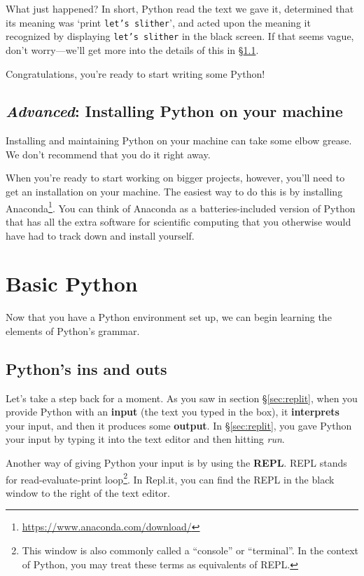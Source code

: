 \documentclass{article}
\let\oldsection\section
\renewcommand\section{\clearpage\oldsection}
\let\oldref\ref
\renewcommand\ref{\S\oldref}
\begin{document}
What just happened? In short, Python read the text we gave it, determined that its meaning was `print {\tt let's slither}', and acted upon the meaning it recognized by displaying {\tt let's slither} in the black screen. If that seems vague, don't worry---we'll get more into the details of this in \ref{sec:repl}.

Congratulations, you're ready to start writing some Python!

\subsection{{\slshape Advanced}: Installing Python on your machine}
\label{install}

Installing and maintaining Python on your machine can take some elbow grease. We don't recommend that you do it right away. 

When you're ready to start working on bigger projects, however, you'll need to get an installation on your machine. The easiest way to do this is by installing Anaconda\footnote{\url{https://www.anaconda.com/download/}}. You can think of Anaconda as a batteries-included version of Python that has all the extra software for scientific computing that you otherwise would have had to track down and install yourself.

\section{Basic Python}

Now that you have a Python environment set up, we can begin learning the elements of Python's grammar.

\subsection{Python's ins and outs}
\label{sec:repl}

Let's take a step back for a moment. As you saw in section \ref{sec:replit}, when you provide Python with an \textbf{input} (the text you typed in the box), it \textbf{interprets} your input, and then it produces some \textbf{output}. In \ref{sec:replit}, you gave Python your input by typing it into the text editor and then hitting \emph{run}. 

Another way of giving Python your input is by using the \textbf{REPL}. REPL stands for read-evaluate-print loop\footnote{This window is also commonly called a ``console'' or ``terminal''. In the context of Python, you may treat these terms as equivalents of REPL.}. In Repl.it, you can find the REPL in the black window to the right of the text editor. 
\end{document}
